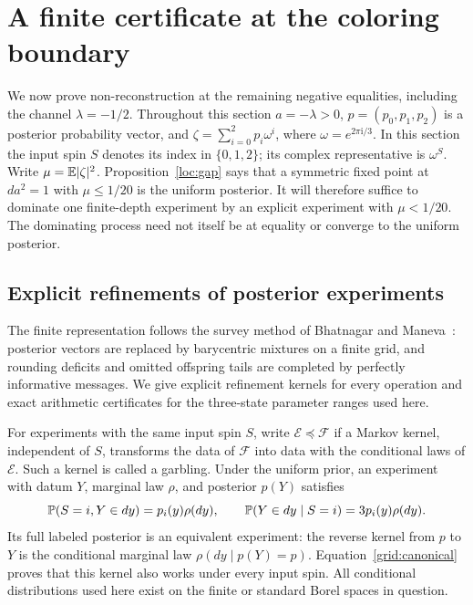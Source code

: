 \section{A finite certificate at the coloring boundary}
\label{grid:section}

We now prove non-reconstruction at the remaining negative equalities, including
the channel $\lambda=-1/2$.  Throughout this section $a=-\lambda>0$,
$p=(p_0,p_1,p_2)$ is a posterior probability vector, and
$\zeta=\sum_{i=0}^2p_i\omega^i$, where $\omega=e^{2\pi\mathrm{i}/3}$.
In this section the input spin $S$ denotes its index in $\{0,1,2\}$;
its complex representative is $\omega^S$.
Write $\mu=\mathbb E|\zeta|^2$.  Proposition~\ref{loc:gap} says that a symmetric
fixed point at $da^2=1$ with $\mu\leq 1/20$ is the uniform posterior.
It will therefore suffice to dominate one finite-depth experiment by an
explicit experiment with $\mu<1/20$.  The dominating process need not itself
be at equality or converge to the uniform posterior.

\subsection{Explicit refinements of posterior experiments}

The finite representation follows the survey method of Bhatnagar and
Maneva~\cite[Sections~3.1--3.3 and Theorems~5--8]{BhatnagarManeva2011}:
posterior vectors are replaced by barycentric mixtures on a finite grid,
and rounding deficits and omitted offspring tails are completed by
perfectly informative messages. We give explicit refinement kernels for
every operation and exact arithmetic certificates for the three-state
parameter ranges used here.

For experiments with the same input spin $S$, write $\mathcal E\preceq
\mathcal F$ if a Markov kernel, independent of $S$, transforms the data of
$\mathcal F$ into data with the conditional laws of $\mathcal E$.
Such a kernel is called a garbling.  Under the uniform prior, an experiment
with datum $Y$, marginal law $\rho$, and posterior $p(Y)$ satisfies
\begin{equation}
 \mathbb P(S=i,Y\in dy)=p_i(y)\rho(dy),\qquad
 \mathbb P(Y\in dy\mid S=i)=3p_i(y)\rho(dy).
 \label{grid:canonical}
\end{equation}
Its full labeled posterior is an equivalent experiment: the reverse kernel
from $p$ to $Y$ is the conditional marginal law $\rho(dy\mid p(Y)=p)$.
Equation~\eqref{grid:canonical} proves that this kernel also works under
every input spin.  All conditional distributions used here exist on the
finite or standard Borel spaces in question.

